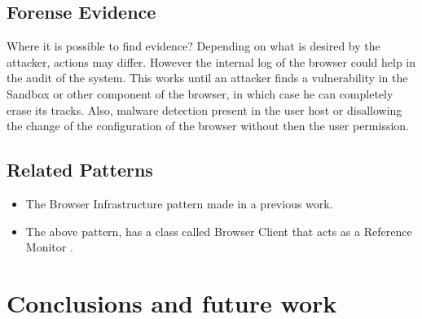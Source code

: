 \documentclass{sig-alternate-05-2015}
\begin{document}
\subsection*{Forense Evidence}
  Where it is possible to find evidence? Depending on what is desired by the attacker, actions may differ. However the internal log of the browser could help in the audit of the system. This works until an attacker finds a vulnerability in the Sandbox or other component of the browser, in which case he can completely erase its tracks. Also, malware detection present in the user host or disallowing the change of the configuration of the browser without then the user permission.

\subsection*{Related Patterns}
  \begin{itemize}
    \item The Browser Infrastructure pattern made in a previous work.
    \item The above pattern, has a class called Browser Client that acts as a Reference Monitor \cite{fernandez2001pattern}.
  \end{itemize}


\section{Conclusions and future work}


\end{document}
